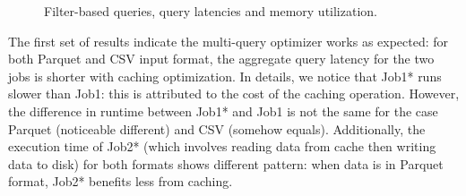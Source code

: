 \begin{figure}[htbp]
	\centering


   \caption{Filter-based queries, query latencies and memory utilization.}
   \label{fig:query1}
\end{figure}

The first set of results indicate the multi-query optimizer works as expected: for both Parquet and CSV input format, the aggregate query latency for the two jobs is shorter with caching optimization. In details, we notice that Job1* runs slower than Job1: this is attributed to the cost of the caching operation. However, the difference in runtime between Job1* and Job1 is not the same for the case Parquet (noticeable different) and CSV (somehow equals). Additionally, the execution time of Job2* (which involves reading data from cache then writing data to disk) for both formats shows different pattern: when data is in Parquet format, Job2* benefits less from caching.

